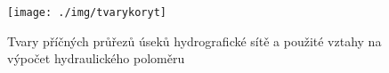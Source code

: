 \begin{figure}[b!]
  \centering
  \texttt{[image: ./img/tvarykoryt]}
  \caption{Tvary příčných průřezů úseků hydrografické sítě a použité vztahy na výpočet hydraulického poloměru}
  \label{fig:tvary_koryt}
\end{figure}
